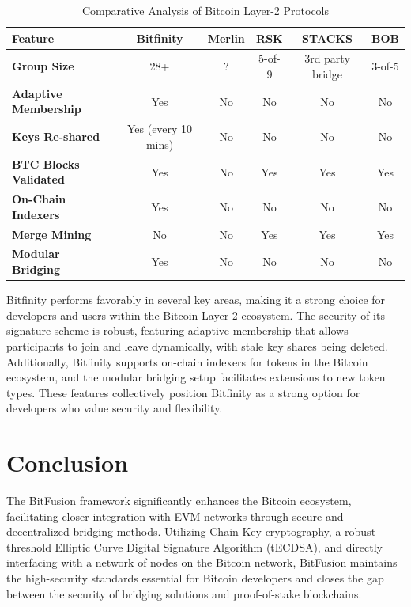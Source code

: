 \documentclass{article}
\begin{document}
\begin{table}[H]
    \centering
    \renewcommand{\arraystretch}{1.5} %
    \begin{tabular}{|l|c|c|c|c|c|}
        \hline
        \textbf{Feature} & \textbf{Bitfinity} & \textbf{Merlin} & \textbf{RSK} & \textbf{STACKS} & \textbf{BOB} \\
        \hline
        \textbf{Group Size} & 28+ & ? & 5-of-9 & 3rd party bridge & 3-of-5 \\
        \hline
        \textbf{Adaptive Membership} & Yes & No & No & No & No \\
        \hline
        \textbf{Keys Re-shared} & Yes (every 10 mins) & No & No & No & No \\
        \hline
        \textbf{BTC Blocks Validated} & Yes & No & Yes & Yes & Yes \\
        \hline
        \textbf{On-Chain Indexers} & Yes & No & No & No & No \\
        \hline
        \textbf{Merge Mining} & No & No & Yes & Yes & Yes \\
        \hline
        \textbf{Modular Bridging} & Yes & No & No & No & No \\
        \hline
    \end{tabular}
    \caption{Comparative Analysis of Bitcoin Layer-2 Protocols}
    \label{tab:comparative_analysis}
\end{table}


Bitfinity performs favorably in several key areas, making it a strong choice for developers and users within the Bitcoin Layer-2 ecosystem. The security of its signature scheme is robust, featuring adaptive membership that allows participants to join and leave dynamically, with stale key shares being deleted. Additionally, Bitfinity supports on-chain indexers for tokens in the Bitcoin ecosystem, and the modular bridging setup facilitates extensions to new token types. These features collectively position Bitfinity as a strong option for developers who value security and flexibility.  


\section{Conclusion}

The BitFusion framework significantly enhances the Bitcoin ecosystem, facilitating closer integration with EVM networks through secure and decentralized bridging methods. Utilizing Chain-Key cryptography, a robust threshold Elliptic Curve Digital Signature Algorithm (tECDSA), and directly interfacing with a network of nodes on the Bitcoin network, BitFusion maintains the high-security standards essential for Bitcoin developers and closes the gap between the security of bridging solutions and proof-of-stake blockchains.
\end{document}
